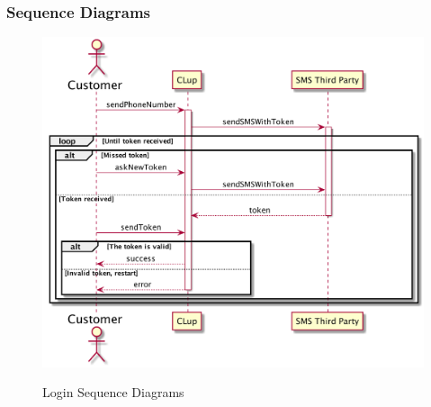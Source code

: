 \subsubsection{Sequence Diagrams}

\begin{figure}[H]
    \centering
    \includegraphics[width=1\textwidth]{uml/login.png}
    \label{fig:seqdiag-login}
    \caption{Login Sequence Diagrams}
\end{figure}


